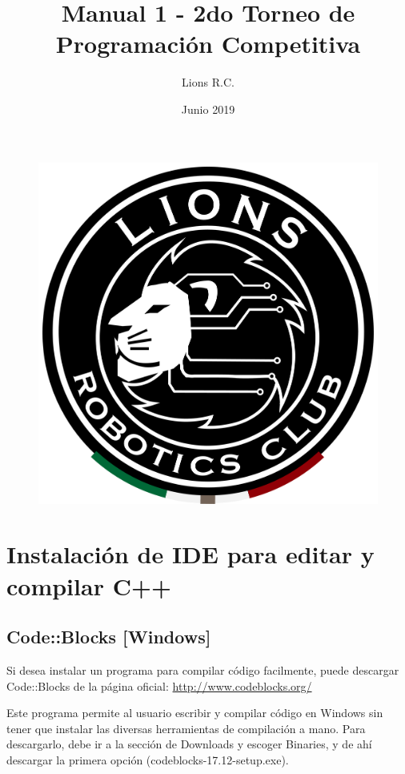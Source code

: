 \documentclass{article}
\title{Manual 1 - 2do Torneo de Programación Competitiva}
\author{Lions R.C.}
\date{Junio 2019}
\begin{document}
\maketitle

\begin{figure}[H]
    \centering
    \includegraphics[width=0.2\paperwidth]{newblack}
\end{figure}

\section{Instalación de IDE para editar y compilar C++}

\subsection{Code::Blocks [Windows]}
Si desea instalar un programa para compilar código facilmente, puede descargar Code::Blocks de la página oficial: \url{http://www.codeblocks.org/}

Este programa permite al usuario escribir y compilar código en Windows sin tener que instalar las diversas herramientas de compilación a mano. Para descargarlo, debe ir a la sección de Downloads y escoger Binaries, y de ahí descargar la primera opción (codeblocks-17.12-setup.exe).
\end{document}
